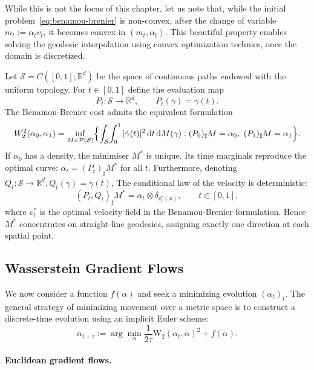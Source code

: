 While this is not the focus of this chapter, let us note that, while the initial problem~\eqref{eq:benamou-brenier} is non-convex, after the change of variable $m_t := \alpha_t v_t$, it becomes convex in $(m_t,\alpha_t)$. This beautiful property enables solving the geodesic interpolation using convex optimization technics, once the domain is discretized. 


\begin{rem} %
Let $\mathcal S=C([0,1];\mathbb R^d)$ be the space of continuous paths endowed with the uniform topology.  For $t\in[0,1]$ define the evaluation map
\[
P_t: \mathcal S\to\mathbb R^d,\qquad P_t(\gamma)=\gamma(t).
\]
The Benamou-Brenier cost admits the equivalent formulation
\[
W_2^2(\alpha_0,\alpha_1)=\inf_{M\in\mathcal P(\mathcal S)}\Bigl\{\int_{\mathcal S}\!\int_0^1|\dot\gamma(t)|^2\,\d t\,\d M(\gamma): (P_0)_{\sharp}M=\alpha_0,\ (P_1)_{\sharp}M=\alpha_1\Bigr\}.
\]
If $\alpha_0$ has a density, the minimiser $M^*$ is unique. Its time marginals reproduce the optimal curve: $\alpha_t=(P_t)_{\sharp}M^*$ for all $t$.  Furthermore, denoting $Q_t: \mathcal S\to\mathbb R^d, Q_t(\gamma)=\dot\gamma(t)$, 
The conditional law of the velocity is deterministic:
\[
(P_t, Q_t)_{\sharp}M^* = \alpha_t\otimes\delta_{v_t^*(x)},\qquad t\in[0,1],
\]
where $v_t^*$ is the optimal velocity field in the Benamou-Brenier formulation. Hence $M^*$ concentrates on straight-line geodesics, assigning exactly one direction at each spatial point.
\end{rem}



\subsection{Wasserstein Gradient Flows}

We now consider a function $f(\alpha)$ and seek a minimizing evolution $(\alpha_t)_t$. The general strategy of minimizing movement over a metric space is to construct a discrete-time evolution using an implicit Euler scheme:
\begin{equation}
    \alpha_{t+\tau} := \arg\min_\alpha \frac{1}{2 \tau} \mathrm{W}_2(\alpha_t, \alpha)^2 + f(\alpha). \label{eq:jko-discr}
\end{equation}

\paragraph{Euclidean gradient flows.}

